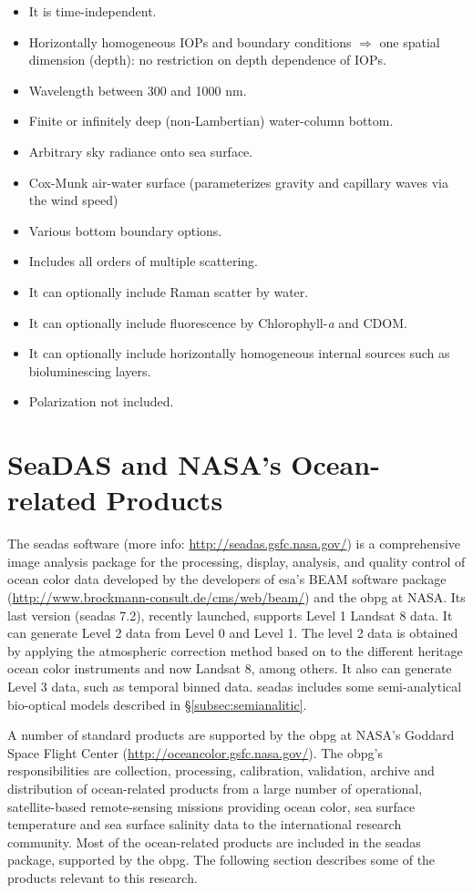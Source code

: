 \begin{itemize}
	\item It is time-independent.
	\item Horizontally homogeneous IOPs and boundary conditions $\Rightarrow$ one spatial dimension (depth): no restriction on depth dependence of IOPs.
	\item Wavelength between 300 and 1000 nm.
	\item Finite or infinitely deep (non-Lambertian) water-column bottom.
	\item Arbitrary sky radiance onto sea surface.
	\item Cox-Munk air-water surface (parameterizes gravity and capillary waves via the wind speed)
	\item Various bottom boundary options.
	\item Includes all orders of multiple scattering.
	\item It can optionally include Raman scatter by water.
	\item It can optionally include fluorescence by Chlorophyll-{\it a} and CDOM.
	\item It can optionally include horizontally homogeneous internal sources such as bioluminescing layers.
	\item Polarization not included.
\end{itemize}
\section{SeaDAS and NASA's Ocean-related Products}
\label{sec:seadas}

The \gls{seadas} software (more info: \url{http://seadas.gsfc.nasa.gov/}) is a comprehensive image analysis package for the processing, display, analysis, and quality control of ocean color data developed by the developers of \gls{esa}'s BEAM software package (\url{http://www.brockmann-consult.de/cms/web/beam/}) and the \gls{obpg} at NASA. Its last version (\gls{seadas} 7.2), recently launched, supports Level 1 Landsat 8 data. It can generate Level 2 data from Level 0 and Level 1. The level 2 data is obtained by applying the atmospheric correction method based on \cite{Gordon:1994} to the different heritage ocean color instruments and now Landsat 8, among others. It also can generate Level 3 data, such as temporal binned data. \gls{seadas} includes some  semi-analytical bio-optical models described in \S\ref{subsec:semianalitic}.

A number of standard products are supported by the \gls{obpg} at NASA's Goddard Space Flight Center (\url{http://oceancolor.gsfc.nasa.gov/}). The \gls{obpg}'s responsibilities are collection, processing, calibration, validation, archive and distribution of ocean-related products from a large number of operational, satellite-based remote-sensing missions providing ocean color, sea surface temperature and sea surface salinity data to the international research community. Most of the ocean-related products are included in the \gls{seadas} package, supported by the \gls{obpg}. The following section describes some of the products relevant to this research.


